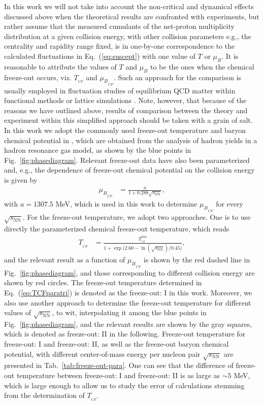 \documentclass[%
reprint,
superscriptaddress,
showpacs,preprintnumbers,
 amsmath,amssymb,
 aps,
prd,
]{revtex4-1}
\def\Fig#1{Fig.~\ref{#1}} \def\Tab#1{Tab.~\ref{#1}}
\def\Eq#1{Eq.~(\ref{#1})}
\begin{document}
In this work we will not take into account the non-critical and dynamical effects discussed above when the theoretical results are confronted with experiments, but rather assume that the measured cumulants of the net-proton multiplicity distribution at a given collision energy, with other collision parameters e.g., the centrality and rapidity range fixed, is in one-by-one correspondence to the calculated fluctuations in \Eq{eq:suscept} with one value of $T$ or $\mu_B$. It is reasonable to attribute the values of $T$ and $\mu_B$ to be the ones when the chemical freeze-out occurs, viz. $T_{_{CF}}$ and ${\mu_B}_{_{CF}}$. Such an approach for the comparison is usually employed in fluctuation studies of equilibrium QCD matter within functional methods or lattice simulations \cite{Fu:2015amv,Isserstedt:2019pgx,Bazavov:2020bjn}. Note, however, that because of the reasons we have outlined above, results of comparison between the theory and experiment within this simplified approach should be taken with a grain of salt. In this work we adopt the commonly used freeze-out temperature and baryon chemical potential in \cite{Andronic:2017pug}, which are obtained from the analysis of hadron yields in a hadron resonance gas model, as shown by the blue points in \Fig{fig:phasediagram}. Relevant freeze-out data have also been parameterized \cite{Andronic:2017pug} and, e.g., the dependence of freeze-out chemical potential on the collision energy is given by
%
\begin{align}
   {\mu_B}_{_{CF}}&=\frac{a}{1+0.288\sqrt{s_{\mathrm{NN}}}},\label{}
\end{align}
%
with $a=1307.5$ MeV, which is used in this work to determine ${\mu_B}_{_{CF}}$ for every $\sqrt{s_{\mathrm{NN}}}$. For the freeze-out temperature, we adopt two approaches. One is to use directly the parameterized chemical freeze-out temperature, which reads
%
\begin{align}
   T_{_{CF}}&=\frac{ T^{lim}_{_{CF}}}{1+\exp\big(2.60-\ln(\sqrt{s_{\mathrm{NN}}})/0.45\big)},\label{eq:TCFparatri}
\end{align}
%
and the relevant result as a function of ${\mu_B}_{_{CF}}$ is shown by the red dashed line in \Fig{fig:phasediagram}, and those corresponding to different collision energy are shown by red circles. The freeze-out temperature determined in \Eq{eq:TCFparatri} is denoted as the freeze-out: I in this work. Moreover, we also use another approach to determine the freeze-out temperature for different values of $\sqrt{s_{\mathrm{NN}}}$, to wit, interpolating it among the blue points in \Fig{fig:phasediagram}, and the relevant results are shown by the gray squares, which is denoted as freeze-out: II in the following. Freeze-out temperature for freeze-out: I and freeze-out: II, as well as the freeze-out baryon chemical potential, with different center-of-mass energy per nucleon pair $\sqrt{s_{\mathrm{NN}}}$ are presented in \Tab{tab:freeze-out-para}. One can see that the difference of freeze-out temperature between freeze-out: I and freeze-out: II is as large as $\sim 5$ MeV, which is large enough to allow us to study the error of calculations stemming from the determination of $T_{_{CF}}$.
\end{document}
